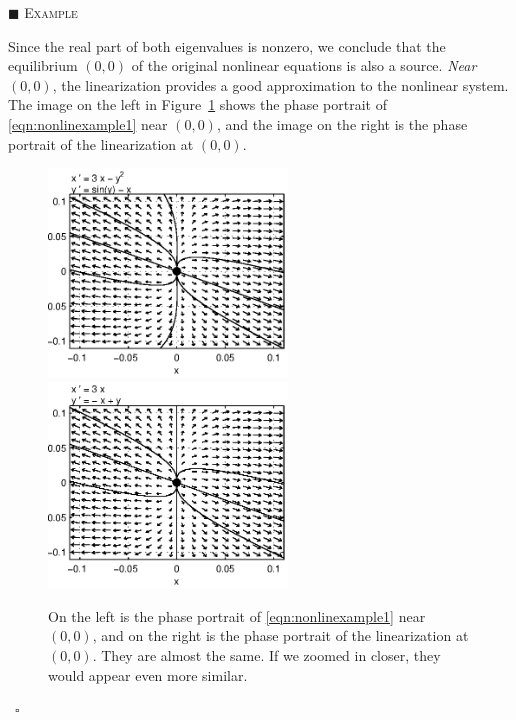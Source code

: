 \documentclass[reqno]{immbook}
\numberwithin{equation}{chapter}
\numberwithin{question}{section}
\numberwithin{theorem}{chapter}
\numberwithin{figure}{chapter}
\theoremstyle{definition}
\newenvironment{xexample}%
{%

\medskip\noindent\addtocounter{example}{1}$\blacksquare$ \textsc{Example \theexample}\hspace*{1em}%
}%
{%
~\hfill$\square$

\medskip
}
\begin{document}
\begin{xexample}
Since the real part of both eigenvalues is nonzero,
we conclude that the equilibrium $(0,0)$ of the original
nonlinear equations is also a source.
\emph{Near $(0,0)$}, the linearization provides a
good approximation to the nonlinear system.
The image on the left in Figure~\ref{fig:nonlinexample1compare}
shows the phase portrait of \eqref{eqn:nonlinexample1}
near $(0,0)$, and the image on the right
is the phase portrait of the linearization at $(0,0)$.
\begin{figure}
\centerline{%
\includegraphics[width=2.5in]{pplane_plots/NonlinExample1detail.ps}
\includegraphics[width=2.5in]{pplane_plots/NonlinExample1lin.ps}
}
\caption{On the left is the phase portrait of
\eqref{eqn:nonlinexample1} near $(0,0)$, and on the
right is the phase portrait of the linearization
at $(0,0)$.  They are almost the same.  If we zoomed
in closer, they would appear even more similar.}
\label{fig:nonlinexample1compare}
\end{figure}
\end{xexample}
%
%
\end{document}
